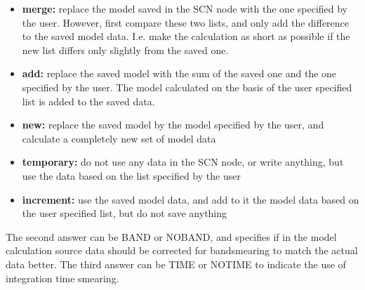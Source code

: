 \begin{itemize}
\item	{\bf merge:}	
	replace the model saved in the SCN node with the one
                     specified by the user. However, first compare these two
                     lists, and only add the difference to the saved model data.
                     I.e. make the calculation as short as possible if the new
                     list differs only slightly from the saved one.
\item	{\bf add:}	
		replace the saved model with the sum of the saved one and
                     the one specified by the user. The model calculated on the
                     basis of the user specified list is added to the saved
                     data.
\item	{\bf new:}
		replace the saved model by the model specified by the user,
                     and calculate a completely new set of model data
\item	{\bf temporary:}
		do not use any data in the SCN node, or write anything, but
                     use the data based on the list specified by the user
\item	{\bf increment:}	
	use the saved model data, and add to it the model data
                    based on the user specified list, but do not save anything
\end{itemize}

The second answer can be BAND or NOBAND, and specifies if in the model
calculation source data should be corrected for bandsmearing to match
the actual data better.  The third answer can be TIME or NOTIME to
indicate the use of integration time smearing. 









